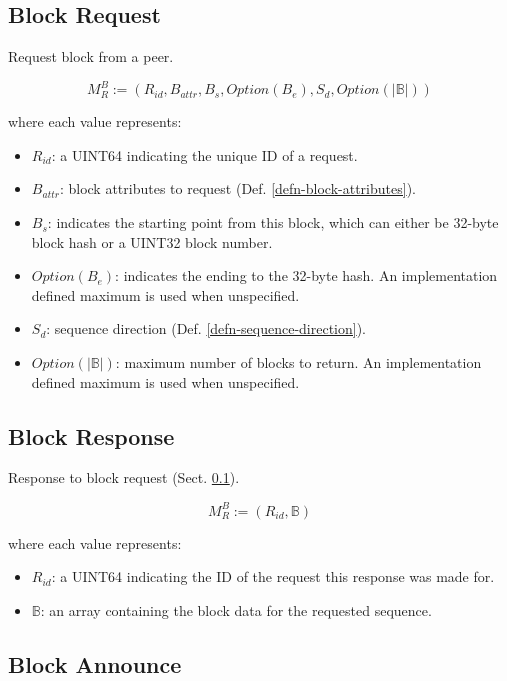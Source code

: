\documentclass{book}
\begin{document}
\subsection{Block Request}\label{sect-block-request}

Request block from a peer.

\[
    M^B_R := (R_{id}, B_{attr}, B_s, Option(B_e), S_d, Option(|\mathbb{B}|))
\]

where each value represents:

\begin{itemize}
    \item $R_{id}$: a UINT64 indicating the unique ID of a request.
    \item $B_{attr}$: block attributes to request (Def.
    \ref{defn-block-attributes}).
    \item $B_s$: indicates the starting point from this block, which can either
    be 32-byte block hash or a UINT32 block number.
    \item $Option(B_e)$: indicates the ending to the 32-byte hash. An
    implementation defined maximum is used when unspecified.
    \item $S_d$: sequence direction (Def. \ref{defn-sequence-direction}). 
    \item $Option(|\mathbb{B}|)$: maximum number of blocks to return. An implementation
    defined maximum is used when unspecified.
\end{itemize}

\subsection{Block Response}

Response to block request (Sect. \ref{sect-block-request}).

\[
    M^B_R := (R_{id}, \mathbb{B})
\]

where each value represents:

\begin{itemize}
    \item $R_{id}$: a UINT64 indicating the ID of the request this response was
    made for.
    \item $\mathbb{B}$: an array containing the block data for the requested
    sequence.
\end{itemize}

\subsection{Block Announce}
\end{document}
